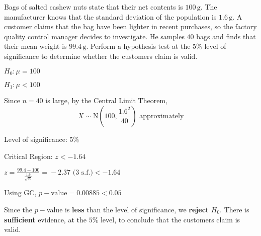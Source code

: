 \documentclass[11pt,a4paper]{book}
\begin{document}
\newpage

\begin{example}

Bags of salted cashew nuts state that their net contents is $100\,\text{g}$.
The manufacturer knows that the standard deviation of the population
is $1.6\,\text{g}$. A customer claims that the bag have been lighter
in recent purchases, so the factory quality control manager decides
to investigate. He samples $40$ bags and finds that their mean weight
is $99.4\,\text{g}$. Perform a hypothesis test at the $5\%$ level
of significance to determine whether the customers claim is valid.

\Solution

\begin{steps}[leftmargin=1.5cm]

\item  $H_{0}:\mu=100$

$H_{1}:\mu<100$

\item  Since $n=40$ is large, by the Central Limit Theorem,
\[
\overline{X}\sim\text{N}\left(100,\frac{1.6^{2}}{40}\right)\text{ approximately}
\]

\item  Level of significance: $5\%$

Critical Region: $z<-1.64$

\item  ${\displaystyle z=\frac{99.4-100}{\frac{1.6}{\sqrt{40}}}=}-2.37\text{ (3 s.f.)}<-1.64$

\item  Using GC, $p-\text{value}=0.00885<0.05$

\item

\begin{tcolorbox}[colback=white, colframe=black,boxrule=.4pt, sharpish corners,box align=center]

Since the $p-$value is \textbf{less} than the level of significance,
we \textbf{reject} $H_{0}$. There is \textbf{sufficient} evidence,
at the $5\%$ level, to conclude that the customers claim is valid.
\end{tcolorbox}

\end{steps}

\end{example}



\newpage
\end{document}
